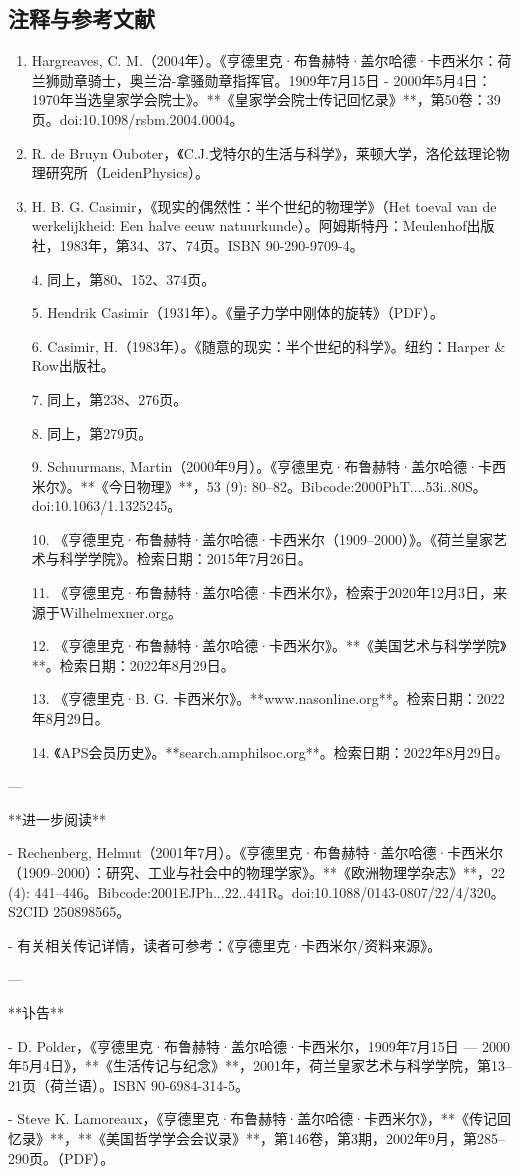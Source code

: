 \subsection{注释与参考文献}
\begin{enumerate}
\item Hargreaves, C. M.（2004年）。《亨德里克·布鲁赫特·盖尔哈德·卡西米尔：荷兰狮勋章骑士，奥兰治-拿骚勋章指挥官。1909年7月15日 - 2000年5月4日：1970年当选皇家学会院士》。**《皇家学会院士传记回忆录》**，第50卷：39页。doi:10.1098/rsbm.2004.0004。
\item R. de Bruyn Ouboter，《C.J.戈特尔的生活与科学》，莱顿大学，洛伦兹理论物理研究所（LeidenPhysics）。
\item H. B. G. Casimir，《现实的偶然性：半个世纪的物理学》（Het toeval van de werkelijkheid: Een halve eeuw natuurkunde）。阿姆斯特丹：Meulenhof出版社，1983年，第34、37、74页。ISBN 90-290-9709-4。

4. 同上，第80、152、374页。

5. Hendrik Casimir（1931年）。《量子力学中刚体的旋转》（PDF）。

6. Casimir, H.（1983年）。《随意的现实：半个世纪的科学》。纽约：Harper & Row出版社。

7. 同上，第238、276页。

8. 同上，第279页。

9. Schuurmans, Martin（2000年9月）。《亨德里克·布鲁赫特·盖尔哈德·卡西米尔》。**《今日物理》**，53 (9): 80–82。Bibcode:2000PhT....53i..80S。doi:10.1063/1.1325245。

10. 《亨德里克·布鲁赫特·盖尔哈德·卡西米尔（1909–2000）》。《荷兰皇家艺术与科学学院》。检索日期：2015年7月26日。

11. 《亨德里克·布鲁赫特·盖尔哈德·卡西米尔》，检索于2020年12月3日，来源于Wilhelmexner.org。

12. 《亨德里克·布鲁赫特·盖尔哈德·卡西米尔》。**《美国艺术与科学学院》**。检索日期：2022年8月29日。

13. 《亨德里克·B. G. 卡西米尔》。**www.nasonline.org**。检索日期：2022年8月29日。

14. 《APS会员历史》。**search.amphilsoc.org**。检索日期：2022年8月29日。
\end{enumerate}

---

**进一步阅读**

- Rechenberg, Helmut（2001年7月）。《亨德里克·布鲁赫特·盖尔哈德·卡西米尔（1909–2000）：研究、工业与社会中的物理学家》。**《欧洲物理学杂志》**，22 (4): 441–446。Bibcode:2001EJPh...22..441R。doi:10.1088/0143-0807/22/4/320。S2CID 250898565。

- 有关相关传记详情，读者可参考：《亨德里克·卡西米尔/资料来源》。

---

**讣告**

- D. Polder，《亨德里克·布鲁赫特·盖尔哈德·卡西米尔，1909年7月15日 — 2000年5月4日》，**《生活传记与纪念》**，2001年，荷兰皇家艺术与科学学院，第13–21页（荷兰语）。ISBN 90-6984-314-5。

- Steve K. Lamoreaux，《亨德里克·布鲁赫特·盖尔哈德·卡西米尔》，**《传记回忆录》**，**《美国哲学学会会议录》**，第146卷，第3期，2002年9月，第285–290页。（PDF）。